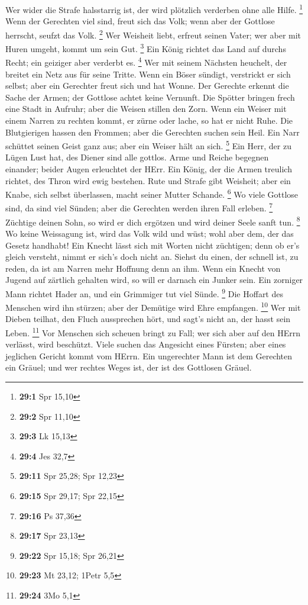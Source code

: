  Wer wider die Strafe halsstarrig ist, der wird plötzlich
verderben ohne alle Hilfe. \footnote{\textbf{29:1} Spr 15,10}
 Wenn der Gerechten viel sind, freut sich das Volk; wenn
aber der Gottlose herrscht, seufzt das Volk. \footnote{\textbf{29:2} Spr
  11,10}  Wer Weisheit liebt, erfreut seinen Vater; wer
aber mit Huren umgeht, kommt um sein Gut. \footnote{\textbf{29:3} Lk
  15,13}  Ein König richtet das Land auf durchs Recht; ein
geiziger aber verderbt es. \footnote{\textbf{29:4} Jes 32,7}
 Wer mit seinem Nächsten heuchelt, der breitet ein Netz
aus für seine Tritte.  Wenn ein Böser sündigt, verstrickt
er sich selbst; aber ein Gerechter freut sich und hat Wonne.
 Der Gerechte erkennt die Sache der Armen; der Gottlose
achtet keine Vernunft.  Die Spötter bringen frech eine
Stadt in Aufruhr; aber die Weisen stillen den Zorn.  Wenn
ein Weiser mit einem Narren zu rechten kommt, er zürne oder lache, so
hat er nicht Ruhe.  Die Blutgierigen hassen den Frommen;
aber die Gerechten suchen sein Heil.  Ein Narr schüttet
seinen Geist ganz aus; aber ein Weiser hält an sich. \footnote{\textbf{29:11}
  Spr 25,28; Spr 12,23}  Ein Herr, der zu Lügen Lust hat,
des Diener sind alle gottlos.  Arme und Reiche begegnen
einander; beider Augen erleuchtet der HErr.  Ein König,
der die Armen treulich richtet, des Thron wird ewig bestehen.
 Rute und Strafe gibt Weisheit; aber ein Knabe, sich
selbst überlassen, macht seiner Mutter Schande. \footnote{\textbf{29:15}
  Spr 29,17; Spr 22,15}  Wo viele Gottlose sind, da sind
viel Sünden; aber die Gerechten werden ihren Fall erleben. \footnote{\textbf{29:16}
  Ps 37,36}  Züchtige deinen Sohn, so wird er dich
ergötzen und wird deiner Seele sanft tun. \footnote{\textbf{29:17} Spr
  23,13}  Wo keine Weissagung ist, wird das Volk wild und
wüst; wohl aber dem, der das Gesetz handhabt!  Ein Knecht
lässt sich mit Worten nicht züchtigen; denn ob er's gleich versteht,
nimmt er sich's doch nicht an.  Siehst du einen, der
schnell ist, zu reden, da ist am Narren mehr Hoffnung denn an ihm.
 Wenn ein Knecht von Jugend auf zärtlich gehalten wird,
so will er darnach ein Junker sein.  Ein zorniger Mann
richtet Hader an, und ein Grimmiger tut viel Sünde. \footnote{\textbf{29:22}
  Spr 15,18; Spr 26,21}  Die Hoffart des Menschen wird
ihn stürzen; aber der Demütige wird Ehre empfangen. \footnote{\textbf{29:23}
  Mt 23,12; 1Petr 5,5}  Wer mit Dieben teilhat, den Fluch
aussprechen hört, und sagt's nicht an, der hasst sein Leben. \footnote{\textbf{29:24}
  3Mo 5,1}  Vor Menschen sich scheuen bringt zu Fall; wer
sich aber auf den HErrn verlässt, wird beschützt.  Viele
suchen das Angesicht eines Fürsten; aber eines jeglichen Gericht kommt
vom HErrn.  Ein ungerechter Mann ist dem Gerechten ein
Gräuel; und wer rechtes Weges ist, der ist des Gottlosen Gräuel.

